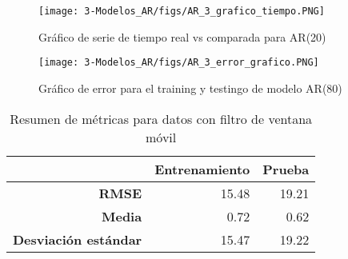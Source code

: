 \begin{figure}[H]
	\centering
	\texttt{[image: 3-Modelos\_AR/figs/AR\_3\_grafico\_tiempo.PNG]}
	\caption{Gráfico de serie de tiempo real vs comparada para AR(20)}
	\label{fig:M3_AR3_grafico_tiempo}
\end{figure}

\begin{figure}[H]
	\centering
	\texttt{[image: 3-Modelos\_AR/figs/AR\_3\_error\_grafico.PNG]}
	\caption{Gráfico de error para el training y testingo de modelo AR(80)}
	\label{fig:M3_AR3_grafico_error}
\end{figure}


\begin{table}[H]
	\centering
	\begin{tabular}{rr|r}
		\hline \hline
		&	Entrenamiento & Prueba \\
		\hline
		\textbf{RMSE}   				& 15.48 & 19.21 \\
		\textbf{Media}     				& 0.72  & 0.62  \\
		\textbf{Desviación estándar} 	& 15.47 & 19.22 \\ 
		\hline \hline
	\end{tabular}
	\caption{Resumen de métricas para datos con filtro de ventana móvil}
	\label{table:M3_AR3_metricas}
\end{table}
